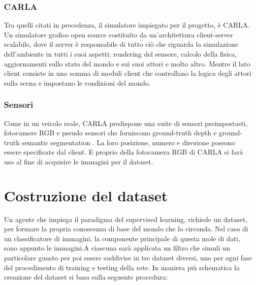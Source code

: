 \documentclass[14pt]{extarticle}
\begin{document}
\subsubsection{CARLA}
Tra quelli citati in precedenza, il simulatore  impiegato per il progetto, è CARLA.
Un simulatore grafico open source costituito da un'architettura client-server scalabile, dove il server è responsabile  di tutto ciò che riguarda la simulazione dell'ambiente in tutti i suoi aspetti: rendering del sensore, calcolo della fisica, aggiornamenti sullo stato del mondo e sui suoi attori e molto altro. 
Mentre il lato client consiste in una somma di moduli client che controllano la logica degli attori sulla scena e impostano le condizioni del mondo.
\subsubsection{Sensori}
Come in un  veicolo reale, CARLA predispone una suite di sensori preimpostasti, fotocamere RGB e pseudo sensori che forniscono ground-truth depth e ground-truth semantic segmentation .
La loro posizione, numero e direzione possono essere specificate dal client.
E proprio della fotocamera RGB di CARLA si farà uso al fine di acquisire le immagini per il dataset.

\section{Costruzione del dataset}
Un agente che impiega il paradigma del supervised learning, richiede un dataset, per formare la propria conoscenza di base del mondo che lo circonda. Nel caso di un classificatore di immagini, la componente principale di questa mole di dati, sono appunto le immagini.A ciascuna sarà applicata un filtro che simuli un particolare guasto per poi essere suddivise in tre dataset diversi, uno per ogni fase del procedimento di training e testing della rete.
In maniera più schematica la creazione del dataset si basa sulla seguente procedura:
\end{document}
